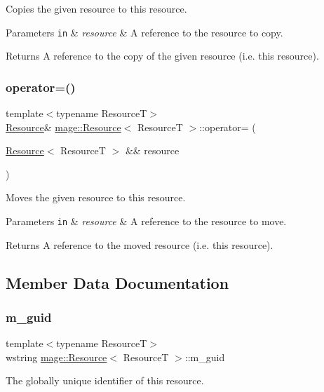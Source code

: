 Copies the given resource to this resource.


\begin{DoxyParams}[1]{Parameters}
\mbox{\tt in}  & {\em resource} & A reference to the resource to copy. \\
\hline
\end{DoxyParams}
\begin{DoxyReturn}{Returns}
A reference to the copy of the given resource (i.\+e. this resource). 
\end{DoxyReturn}
\hypertarget{classmage_1_1_resource_aa1f7a7ddd31f4fc16293b4a5ca9a93c8}{}\label{classmage_1_1_resource_aa1f7a7ddd31f4fc16293b4a5ca9a93c8} 
\subsubsection{\texorpdfstring{operator=()}{operator=()}\hspace{0.1cm}{\footnotesize\ttfamily [2/2]}}
{\footnotesize\ttfamily template$<$typename ResourceT$>$ \\
\hyperlink{classmage_1_1_resource}{Resource}\& \hyperlink{classmage_1_1_resource}{mage\+::\+Resource}$<$ ResourceT $>$\+::operator= (\begin{DoxyParamCaption}\item[{\hyperlink{classmage_1_1_resource}{Resource}$<$ ResourceT $>$ \&\&}]{resource }\end{DoxyParamCaption})\hspace{0.3cm}{\ttfamily [noexcept]}}

Moves the given resource to this resource.


\begin{DoxyParams}[1]{Parameters}
\mbox{\tt in}  & {\em resource} & A reference to the resource to move. \\
\hline
\end{DoxyParams}
\begin{DoxyReturn}{Returns}
A reference to the moved resource (i.\+e. this resource). 
\end{DoxyReturn}


\subsection{Member Data Documentation}
\hypertarget{classmage_1_1_resource_ac8cf21b8b48c47a104110e12e259ad99}{}\label{classmage_1_1_resource_ac8cf21b8b48c47a104110e12e259ad99} 
\subsubsection{\texorpdfstring{m\+\_\+guid}{m\_guid}}
{\footnotesize\ttfamily template$<$typename ResourceT$>$ \\
wstring \hyperlink{classmage_1_1_resource}{mage\+::\+Resource}$<$ ResourceT $>$\+::m\+\_\+guid\hspace{0.3cm}{\ttfamily [private]}}

The globally unique identifier of this resource. 